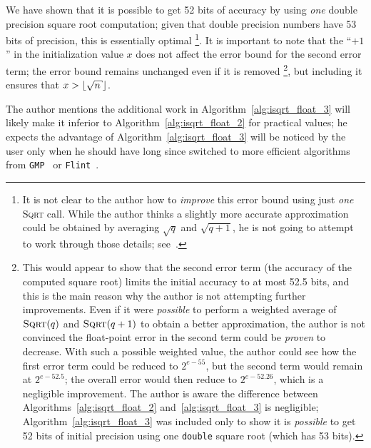 We have shown that it is possible to get 52 bits of accuracy
by using \emph{one} double precision square root computation;
given that double precision numbers have 53 bits of precision,
this is essentially optimal%
\footnote{It is not clear to the author how to \emph{improve}
this error bound using just \emph{one} \textsc{Sqrt} call.
While the author thinks a slightly more accurate approximation
could be obtained by averaging $\sqrt{q}$ and $\sqrt{q+1}$,
he is not going to attempt to work through those details;
see~.}.
It is important to note that the ``$+1$'' in the initialization value $x$
does not affect the error bound for the second error term;
the error bound remains unchanged even if it is removed%
\footnote{\label{footnote:second-error-term}This
would appear to show that the second error term
(the accuracy of the computed square root)
limits the initial accuracy to at most 52.5 bits,
and this is the main reason why the author is not attempting
further improvements.
Even if it were \emph{possible} to perform a weighted average
of $\textsc{Sqrt}(q)$ and $\textsc{Sqrt}(q+1)$
to obtain a better approximation,
the author is not convinced the float-point error in the second term
could be \emph{proven} to decrease.
With such a possible weighted value,
the author could see how the first error term could be reduced
to $2^{e-55}$, but the second term would remain at $2^{e-52.5}$;
the overall error would then reduce to $2^{e-52.26}$,
which is a negligible improvement.
The author is aware the difference between
Algorithms~\ref{alg:isqrt_float_2} and~\ref{alg:isqrt_float_3}
is negligible;
Algorithm~\ref{alg:isqrt_float_3}
was included only to show it is \emph{possible} to get 52
bits of initial precision using one \texttt{double} square root
(which has 53 bits).
},
but including it ensures that $x > \floor{\sqrt{n}}$.

The author mentions the additional work in
Algorithm~\ref{alg:isqrt_float_3} will likely make it
inferior to Algorithm~\ref{alg:isqrt_float_2} for practical values;
he expects the advantage of Algorithm~\ref{alg:isqrt_float_3}
will be noticed by the user only when he should have long since switched
to more efficient algorithms from
\texttt{GMP}~\cite{gmplib} or \texttt{Flint}~\cite{flint}.

